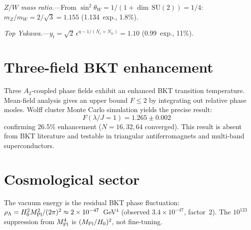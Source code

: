 ﻿\documentclass[aps,prl,twocolumn,superscriptaddress,showpacs]{revtex4-2}
\begin{document}
\textit{$Z/W$ mass ratio.}---From $\sin^2\theta_W = 1/(1+\dim\,\mathrm{SU}(2))
= 1/4$:
$m_Z/m_W = 2/\sqrt{3} = 1.155$ (1.134~exp., 1.8\%).

\textit{Top Yukawa.}---$y_t = \sqrt{2}\,\epsilon^{\eta-1/(N_c+N_w)}
= 1.10$ (0.99~exp., 11\%).


\section{Three-field BKT enhancement}

Three $A_2$-coupled phase fields exhibit an enhanced BKT transition
temperature. Mean-field analysis gives an upper bound $F \leq 2$ by
integrating out relative phase modes. Wolff cluster Monte Carlo
simulation yields the precise result:
\begin{equation}\label{eq:F}
F(\lambda/J = 1) = 1.265 \pm 0.002
\end{equation}
confirming 26.5\% enhancement ($N = 16, 32, 64$ converged). This
result is absent from BKT literature and testable in triangular
antiferromagnets and multi-band superconductors.


\section{Cosmological sector}

The vacuum energy is the residual BKT phase fluctuation:
$\rho_\Lambda = H_0^2 M_{\rm Pl}^2/(2\pi)^2 \approx 2\times10^{-47}$~GeV$^4$
(observed $3.4\times10^{-47}$, factor~2). The $10^{123}$ suppression
from $M_{\rm Pl}^4$ is $(M_{\rm Pl}/H_0)^2$, not fine-tuning.
\end{document}
